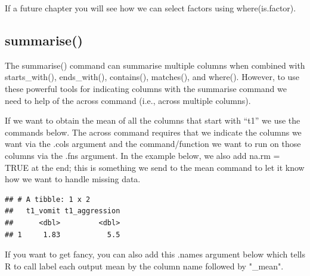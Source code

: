 \documentclass[
]{krantz}
\makeatletter
\newenvironment{Shaded}{\begin{snugshade}}{\end{snugshade}}
\newcommand{\DataTypeTok}[1]{\textcolor[rgb]{0.27,0.27,0.27}{#1}}
\newcommand{\KeywordTok}[1]{\textcolor[rgb]{0.27,0.27,0.27}{\textbf{#1}}}
\newcommand{\NormalTok}[1]{#1}
\newcommand{\OperatorTok}[1]{\textcolor[rgb]{0.43,0.43,0.43}{\textbf{#1}}}
\newcommand{\OtherTok}[1]{\textcolor[rgb]{0.37,0.37,0.37}{#1}}
\newcommand{\StringTok}[1]{\textcolor[rgb]{0.5,0.5,0.5}{#1}}
\newenvironment{kframe}{%
\medskip{}
\setlength{\fboxsep}{.8em}
 \def\at@end@of@kframe{}%
 \ifinner\ifhmode%
  \def\at@end@of@kframe{\end{minipage}}%
  \begin{minipage}{\columnwidth}%
 \fi\fi%
 \def\FrameCommand##1{\hskip\@totalleftmargin \hskip-\fboxsep
 \colorbox{shadecolor}{##1}\hskip-\fboxsep
     \hskip-\linewidth \hskip-\@totalleftmargin \hskip\columnwidth}%
 \MakeFramed {\advance\hsize-\width
   \@totalleftmargin\z@ \linewidth\hsize
   \@setminipage}}%
 {\par\unskip\endMakeFramed%
 \at@end@of@kframe}
\renewenvironment{Shaded}{\begin{kframe}}{\end{kframe}}
\makeatother
\begin{document}
If a future chapter you will see how we can select factors using where(is.factor).

\hypertarget{summarise-1}{%
\subsection{summarise()}\label{summarise-1}}

The summarise() command can summarise multiple columns when combined with starts\_with(), ends\_with(), contains(), matches(), and where(). However, to use these powerful tools for indicating columns with the summarise command we need to help of the across command (i.e., across multiple columns).

If we want to obtain the mean of all the columns that start with ``t1'' we use the commands below. The across command requires that we indicate the columns we want via the .cols argument and the command/function we want to run on those columns via the .fns argument. In the example below, we also add na.rm = TRUE at the end; this is something we send to the mean command to let it know how we want to handle missing data.

\begin{Shaded}
\end{Shaded}

\begin{verbatim}
## # A tibble: 1 x 2
##   t1_vomit t1_aggression
##      <dbl>         <dbl>
## 1     1.83           5.5
\end{verbatim}

If you want to get fancy, you can also add this .names argument below which tells R to call label each output mean by the column name followed by "\_mean".

\begin{Shaded}
\end{Shaded}
\end{document}
